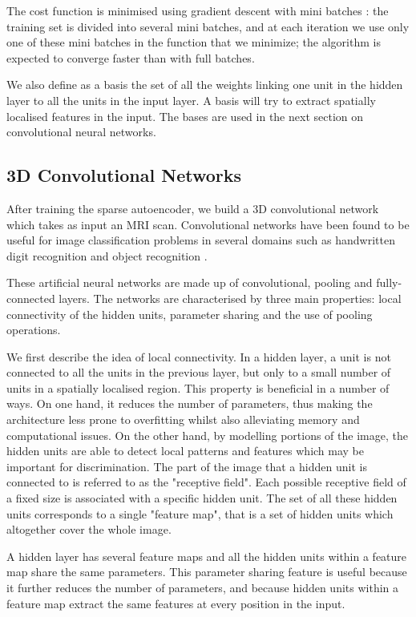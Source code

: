 \documentclass[a4paper,10pt]{article}
\begin{document}
The cost function is minimised using gradient descent with mini batches \cite{practical}: the training set is divided into several mini batches, and at each iteration we use only one of these mini batches in the function that we minimize; the algorithm is expected to converge faster than with full batches.

We also define as a basis the set of all the weights linking one unit in the hidden layer to all the units in the input layer. A basis will try to extract spatially localised features in the input. The bases are used in the next section on convolutional neural networks.

\subsection{3D Convolutional Networks}

\noindent After training the sparse autoencoder, we build a 3D convolutional network which takes as input an MRI scan. Convolutional networks have been found to be useful for image classification problems in several domains such as handwritten digit recognition \cite{jarrett} and object recognition \cite{imagenet}.

These artificial neural networks are made up of convolutional, pooling and fully-connected layers. The networks are characterised by three main properties: local connectivity of the hidden units, parameter sharing and the use of pooling operations.

We first describe the idea of local connectivity. In a hidden layer, a unit is not connected to all the units in the previous layer, but only to a small number of units in a spatially localised region. This property is beneficial in a number of ways. On one hand, it reduces the number of parameters, thus making the architecture less prone to overfitting whilst also alleviating memory and computational issues. On the other hand, by modelling portions of the image, the hidden units are able to detect local patterns and features which may be important for discrimination. The part of the image that a hidden unit is connected to is referred to as the "receptive field". Each possible receptive field of a fixed size is associated with a specific hidden unit. The set of all these hidden units corresponds to a single "feature map", that is a set of hidden units which altogether cover the whole image. 

A hidden layer has several feature maps and all the hidden units within a feature map share the same parameters. This parameter sharing feature is useful because it further reduces the number of parameters, and because hidden units within a feature map extract the same features at every position in the input.
\end{document}
